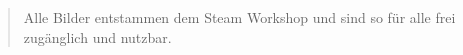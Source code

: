 %
%
%
%


\cleardoublepage
{}


%

\hspace{100cm}

\begin{quote}
	Alle Bilder entstammen dem Steam Workshop und sind so für alle frei zugänglich und nutzbar. ~\cite{Workshop}
\end{quote}